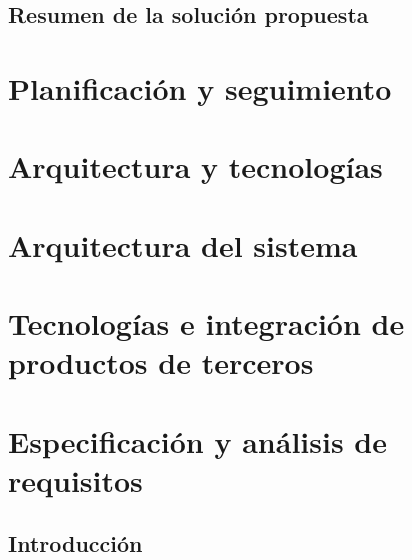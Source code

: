 \documentclass{article}
\begin{document}
    \subsection{Resumen de la solución propuesta}

\section{Planificación y seguimiento}

\section{Arquitectura y tecnologías}

\section{Arquitectura del sistema}

\section{Tecnologías e integración de productos de terceros}

\section{Especificación y análisis de requisitos}

    \subsection{Introducción}
\end{document}
